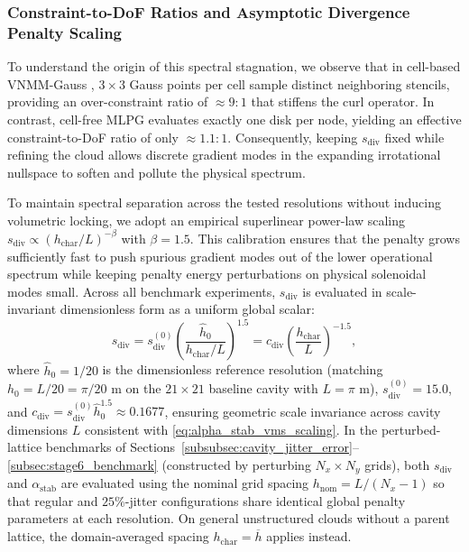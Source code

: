 \documentclass[VANCOUVER]{USG}
\begin{document}
\subsubsection{Constraint-to-DoF Ratios and Asymptotic Divergence Penalty Scaling}
\label{subsubsec:constraint_ratio_scaling}

To understand the origin of this spectral stagnation, we observe that in cell-based VNMM-Gauss \cite{stable_vnmm2d_2026}, $3 \times 3$ Gauss points per cell sample distinct neighboring stencils, providing an over-constraint ratio of $\approx 9:1$ that stiffens the curl operator. In contrast, cell-free MLPG evaluates exactly one disk per node, yielding an effective constraint-to-DoF ratio of only $\approx 1.1:1$. Consequently, keeping $s_{\mathrm{div}}$ fixed while refining the cloud allows discrete gradient modes in the expanding irrotational nullspace to soften and pollute the physical spectrum.

To maintain spectral separation across the tested resolutions without inducing volumetric locking, we adopt an empirical superlinear power-law scaling $s_{\mathrm{div}} \propto (h_{\mathrm{char}} / L)^{-\beta}$ with $\beta = 1.5$. This calibration ensures that the penalty grows sufficiently fast to push spurious gradient modes out of the lower operational spectrum while keeping penalty energy perturbations on physical solenoidal modes small. Across all benchmark experiments, $s_{\mathrm{div}}$ is evaluated in scale-invariant dimensionless form as a uniform global scalar:
\begin{equation}
    s_{\mathrm{div}} = s_{\mathrm{div}}^{(0)} \left( \frac{\hat{h}_0}{h_{\mathrm{char}} / L} \right)^{1.5} = c_{\mathrm{div}} \left( \frac{h_{\mathrm{char}}}{L} \right)^{-1.5},
    \label{eq:s_div_scaling_global}
\end{equation}
where $\hat{h}_0 = 1/20$ is the dimensionless reference resolution (matching $h_0 = L/20 = \pi/20\text{ m}$ on the $21\times 21$ baseline cavity with $L = \pi\text{ m}$), $s_{\mathrm{div}}^{(0)} = 15.0$, and $c_{\mathrm{div}} = s_{\mathrm{div}}^{(0)} \hat{h}_0^{1.5} \approx 0.1677$, ensuring geometric scale invariance across cavity dimensions $L$ consistent with \eqref{eq:alpha_stab_vms_scaling}. In the perturbed-lattice benchmarks of Sections~\ref{subsubsec:cavity_jitter_error}--\ref{subsec:stage6_benchmark} (constructed by perturbing $N_x \times N_y$ grids), both $s_{\mathrm{div}}$ and $\alpha_{\mathrm{stab}}$ are evaluated using the nominal grid spacing $h_{\mathrm{nom}} = L/(N_x - 1)$ so that regular and $25\%$-jitter configurations share identical global penalty parameters at each resolution. On general unstructured clouds without a parent lattice, the domain-averaged spacing $h_{\mathrm{char}} = \overline{h}$ applies instead.
\end{document}
